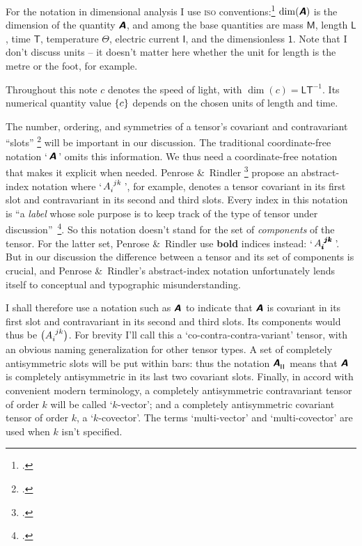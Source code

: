 \documentclass[\ifafour a4paper,12pt,\else a5paper,10pt,\fi%
onecolumn,oneside,article,%
british%
]{memoir}
\makeatletter
\newcommand*{\defquote}[1]{`#1'}
\newcommand*{\mathquote}[1]{`\,#1\,'}
\theoremstyle{remark}
\theoremstyle{innote}
\newcommand*{\mathte}[1]{\textbf{\textit{\textsf{#1}}}}
\newcommand*{\citep}{\footcites}
\newcommand*{\amp}{\&}
\DeclarePairedDelimiter\set{\{}{\}}
\renewcommand*{\|}[1][]{\nonscript\,#1\vert\nonscript\;\mathopen{}}
\newcommand*{\sect}{\S}%
\newcommand*{\q}{}%
\DeclareRobustCommand*{\q}{%
  \mathord{\mathpalette\bigcdot@{}}%
}
\newcommand*{\bigcdot@scalefactor}{0.7}
\newcommand*{\bigcdot@widthfactor}{1.5}
\newcommand*{\bigcdot@}[2]{%
  \sbox0{$#1\vcenter{}$}%
  \sbox2{$#1\cdot\m@th$}%
  \hbox to \bigcdot@widthfactor\wd2{%
    \hfil
    \raise\ht0\hbox{%
      \scalebox{\bigcdot@scalefactor}{%
        \lower\ht0\hbox{$#1\bullet\m@th$}%
      }%
    }%
    \hfil
  }%
}
\newcommand*{\Un}{\textsf{1}}
\newcommand*{\Le}{\textsf{L}}
\newcommand*{\Ti}{\textsf{T}}
\newcommand*{\Ma}{\textsf{M}}
\newcommand*{\Te}{\Theta}
\newcommand*{\Cu}{\textsf{I}}
\newcommand*{\yA}{\mathte{A}}
\renewcommand*{\i}{\indices}
\newcommand*{\rul}{{\mkern2mu\rule[-0.1ex]{0.75pt}{1.1ex}\mkern2mu}}
\DeclarePairedDelimiter\mul{\rul}{\rul}%
\makeatother
\begin{document}
\bigskip

For the notation in dimensional analysis I use \textsc{iso}
conventions:\citep[\sect~5]{iso2009} $\dim(\yA)$ is the dimension of the
quantity $\yA$, and among the base quantities are mass $\Ma$, length $\Le$,
time $\Ti$, temperature $\Te$, electric current $\Cu$, and the
dimensionless $\Un$. Note that I don't discuss units -- it doesn't matter
here whether the unit for length is the metre or the foot, for example.

Throughout this note $c$ denotes the speed of light, with
$\dim(c) = \Le\Ti^{-1}$. Its numerical quantity value $\set{c}$ depends on
the chosen units of length and time.

The number, ordering, and symmetries of a tensor's covariant and
contravariant \enquote{slots} \citep[\sect~3.2]{misneretal1970_r1973} will
be important in our discussion. The traditional coordinate-free notation
\mathquote{$\yA$} omits this information. We thus need a coordinate-free
notation that makes it explicit when needed. Penrose \amp\ Rindler
\citep[\sect~2.2]{penroseetal1984_r2003} propose an abstract-index notation
where \mathquote{$A\i{_{i}^{jk}}$}, for example, denotes a tensor covariant
in its first slot and contravariant in its second and third slots. Every
index in this notation is \enquote{a \emph{label} whose sole purpose is to
  keep track of the type of tensor under
  discussion}~\citep[p.~75]{penroseetal1984_r2003}. So this notation
doesn't stand for the set of \emph{components} of the tensor. For the
latter set, Penrose \amp\ Rindler use \textbf{bold} indices instead:
\mathquote{$A\i{_{\pmb{i}}^{\pmb{j}\pmb{k}}}$}. But in our discussion the
difference between a tensor and its set of components is crucial, and
Penrose \amp\ Rindler's abstract-index notation unfortunately lends itself
to conceptual and typographic misunderstanding.

I shall therefore use a notation such as $\yA\i{_{\q}^{\q\q}}$ to indicate
that $\yA$ is covariant in its first slot and contravariant in its second
and third slots. Its components would thus be $\bigl(A\i{_{i}^{jk}}\bigr)$.
For brevity I'll call this a \defquote{co-contra-contra-variant} tensor,
with an obvious naming generalization for other tensor
types. %
A set of completely antisymmetric slots will be put within bars: thus the
notation $\yA\i{^{\q}_{\mul{\q\q}}}$ means that $\yA$ is completely
antisymmetric in its last two covariant slots. Finally, in accord with
convenient modern terminology, a completely antisymmetric contravariant
tensor of order $k$ will be called \defquote{$k$-vector}; and a completely
antisymmetric covariant tensor of order $k$, a \defquote{$k$-covector}. The
terms \defquote{multi-vector} and \defquote{multi-covector} are used when
$k$ isn't specified.
\end{document}
